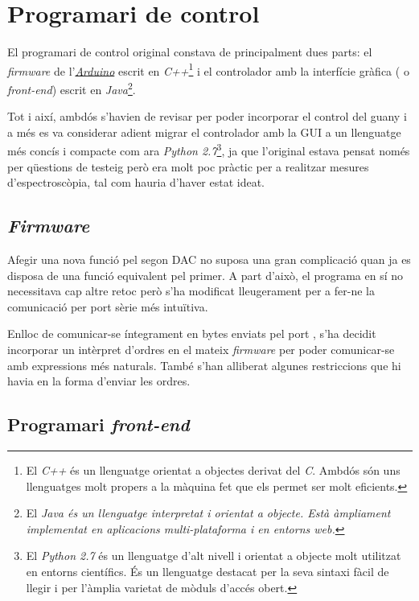 \section{Programari de control}\label{sec:descripcio_del_sistema}

El programari de control original constava de principalment dues parts: el \textit{firmware} de l'\hyperref[subsec:arduino]{\textit{Arduino}} escrit en \textit{C++}\footnote{El \textit{C++} és un llenguatge orientat a objectes derivat del \textit{C}. Ambdós són uns llenguatges molt propers a la màquina fet que els permet ser molt eficients.} i el controlador amb la interfície gràfica ( o \textit{front-end}) escrit en \textit{Java}\footnote{El \textit{Java és un llenguatge interpretat i orientat a objecte. Està àmpliament implementat en aplicacions multi-plataforma i en entorns \textit{web}.}}.

Tot i així, ambdós s'havien de revisar per poder incorporar el control del guany i a més es va considerar adient migrar el controlador amb la \ac{GUI} a un llenguatge més concís i compacte com ara \textit{Python \num{2.7}}\footnote{El \textit{Python \num{2.7}} és un llenguatge d'alt nivell i orientat a objecte molt utilitzat en entorns científics. És un llenguatge destacat per la seva sintaxi fàcil de llegir i per l'àmplia varietat de mòduls d'accés obert.}, ja que l'original estava pensat només per qüestions de testeig però era molt poc pràctic per a realitzar mesures d'espectroscòpia, tal com hauria d'haver estat ideat.

\subsection{\textit{Firmware}}\label{subsec:firmware}

Afegir una nova funció pel segon \ac{DAC} no suposa una gran complicació quan ja es disposa de una funció equivalent pel primer. A part d'això, el programa en sí no necessitava cap altre retoc però s'ha modificat lleugerament per a fer-ne la comunicació per port sèrie més intuïtiva.

Enlloc de comunicar-se íntegrament en bytes enviats pel port , s'ha decidit incorporar un intèrpret d'ordres en el mateix \textit{firmware} per poder comunicar-se amb expressions més naturals. També s'han alliberat algunes restriccions que hi havia en la forma d'enviar les ordres.

\subsection{Programari \textit{front-end}}\label{subsec:programari_front-end}

